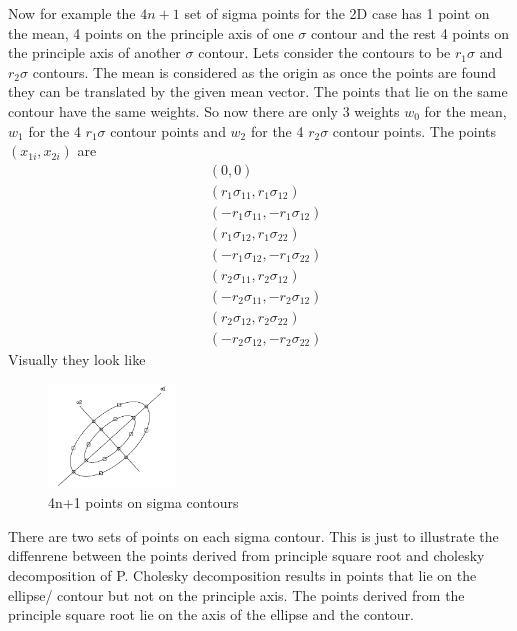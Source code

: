 \documentclass{article}
\begin{document}
 Now for example the $4n+1$ set of sigma points for the 2D case has 1 point on the mean, 4 points on the principle axis of one $\sigma$ contour and the rest 4 points on the principle axis of another $\sigma$ contour. Lets consider the contours to be $r_1\sigma$ and $r_2\sigma$ contours. The mean is considered as the origin as once the points are found they can be translated by the given mean vector. The points that lie on the same contour have the same weights. So now there are only 3 weights $w_0$ for the mean, $w_1$ for the 4 $r_1\sigma$ contour points and $w_2$ for the 4 $r_2\sigma$ contour points. The points $(x_{1i},x_{2i})$ are
 \begin{align}
 &(0,0)\nonumber \\
 &(r_1\sigma_{11},r_1\sigma_{12})\nonumber\\
 &(-r_1\sigma_{11},-r_1\sigma_{12})\nonumber\\
 &(r_1\sigma_{12},r_1\sigma_{22})\nonumber\\
 &(-r_1\sigma_{12},-r_1\sigma_{22})\nonumber\\
 &(r_2\sigma_{11},r_2\sigma_{12})\nonumber\\
 &(-r_2\sigma_{11},-r_2\sigma_{12})\nonumber\\
 &(r_2\sigma_{12},r_2\sigma_{22})\nonumber\\
  &(-r_2\sigma_{12},-r_2\sigma_{22})\label{eq:points1}
 \end{align}
 Visually they look like \newline\newline
\begin{figure}[h]
	\centering
		\includegraphics[width=0.3\textwidth]{4n1contours.jpg}
	\caption{4n+1 points on sigma contours}
	\label{fig:4np1pts}
\end{figure}\newline
 There are two sets of points on each sigma contour. This is just to illustrate the diffenrene between the points derived from principle square root and cholesky decomposition of P. Cholesky decomposition results in points that lie on the ellipse/ contour but not on the principle axis. The points derived from the principle square root lie on the axis of the ellipse and the contour. 
\end{document}
